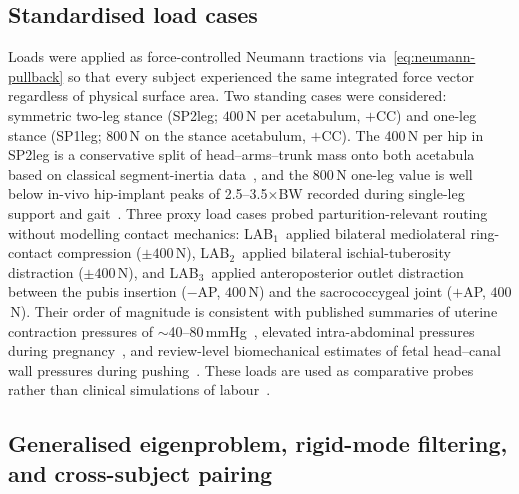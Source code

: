 \documentclass[11pt]{article}
\newcommand{\LABone}{LAB$_1$}
\newcommand{\LABtwo}{LAB$_2$}
\newcommand{\LABthree}{LAB$_3$}
\begin{document}
\subsection{Standardised load cases}
\label{sec:loading}

Loads were applied as force-controlled Neumann tractions via~\eqref{eq:neumann-pullback} so that every subject experienced the same integrated force vector regardless of physical surface area.
Two standing cases were considered: symmetric two-leg stance (SP2leg; $400$\,N per acetabulum, $+$CC) and one-leg stance (SP1leg; $800$\,N on the stance acetabulum, $+$CC).
The 400\,N per hip in SP2leg is a conservative split of head--arms--trunk mass onto both acetabula based on classical segment-inertia data~\citep{deLeva1996}, and the 800\,N one-leg value is well below in-vivo hip-implant peaks of 2.5--3.5$\times$BW recorded during single-leg support and gait~\citep{Bergmann2001JBiomech,Kutzner2016PLOS}.
Three proxy load cases probed parturition-relevant routing without modelling contact mechanics: \LABone\ applied bilateral mediolateral ring-contact compression ($\pm 400$\,N), \LABtwo\ applied bilateral ischial-tuberosity distraction ($\pm 400$\,N), and \LABthree\ applied anteroposterior outlet distraction between the pubis insertion ($-$AP, $400$\,N) and the sacrococcygeal joint ($+$AP, $400$\,N).
Their order of magnitude is consistent with published summaries of uterine contraction pressures of $\sim$40--80\,mmHg~\citep{AJOG2022Uterine,Mosby2012Pocket}, elevated intra-abdominal pressures during pregnancy~\citep{Fuchs2013PLOS,Chun2012IAPReview}, and review-level biomechanical estimates of fetal head--canal wall pressures during pushing~\citep{BiomechPregnancy2022}.
These loads are used as comparative probes rather than clinical simulations of labour~\citep{ChenGrimm2021,Almeida2024Uterus}.

\subsection{Generalised eigenproblem, rigid-mode filtering, and cross-subject pairing}
\label{sec:evp}
\end{document}
